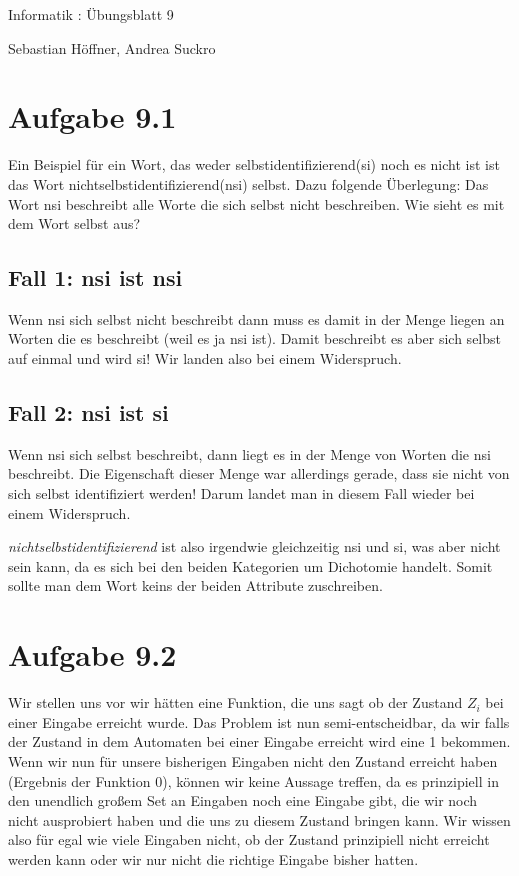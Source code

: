 \documentclass{article}
\begin{document}
\begin{center}
  \Large{Informatik \revD: Übungsblatt 9}

  \large{Sebastian Höffner, Andrea Suckro}
\end{center}

\section*{Aufgabe 9.1}
Ein Beispiel für ein Wort, das weder selbstidentifizierend(si) noch es nicht ist ist das Wort nichtselbstidentifizierend(nsi) selbst. Dazu folgende Überlegung: Das Wort nsi beschreibt alle Worte die sich selbst nicht beschreiben. Wie sieht es mit dem Wort selbst aus?
\subsection*{Fall 1: nsi ist nsi}
Wenn nsi sich selbst nicht beschreibt dann muss es damit in der Menge liegen an Worten die es beschreibt (weil es ja nsi ist). Damit beschreibt es aber sich selbst auf einmal und wird si! Wir landen also bei einem Widerspruch.
\subsection*{Fall 2: nsi ist si}
Wenn nsi sich selbst beschreibt, dann liegt es in der Menge von Worten die nsi beschreibt. Die Eigenschaft dieser Menge war allerdings gerade, dass sie nicht von sich selbst identifiziert werden! Darum landet man in diesem Fall wieder bei einem Widerspruch.

\bigskip
\textit{nichtselbstidentifizierend} ist also irgendwie gleichzeitig nsi und si, was aber nicht sein kann, da es sich bei den beiden Kategorien um Dichotomie handelt. Somit sollte man dem Wort keins der beiden Attribute zuschreiben.

\section*{Aufgabe 9.2}
Wir stellen uns vor wir hätten eine Funktion, die uns sagt ob der Zustand $Z_i$ bei einer Eingabe erreicht wurde. Das Problem ist nun semi-entscheidbar, da wir falls der Zustand in dem Automaten bei einer Eingabe erreicht wird eine 1 bekommen. Wenn wir nun für unsere bisherigen Eingaben nicht den Zustand erreicht haben (Ergebnis der Funktion 0), können wir keine Aussage treffen, da es prinzipiell in den unendlich großem Set an Eingaben noch eine Eingabe gibt, die wir noch nicht ausprobiert haben und die uns zu diesem Zustand bringen kann. Wir wissen also für egal wie viele Eingaben nicht, ob der Zustand prinzipiell nicht erreicht werden kann oder wir nur nicht die richtige Eingabe bisher hatten.
\end{document}
